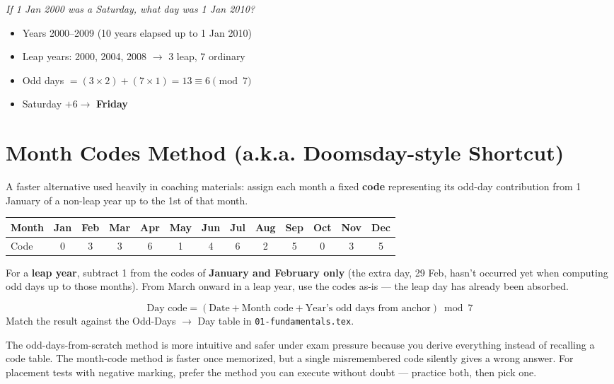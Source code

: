 \documentclass[11pt]{article}
\begin{document}
\begin{examplebox}
\emph{If 1 Jan 2000 was a Saturday, what day was 1 Jan 2010?}
\begin{itemize}[leftmargin=1.4em]
  \item Years 2000--2009 (10 years elapsed up to 1 Jan 2010)
  \item Leap years: 2000, 2004, 2008 $\to$ 3 leap, 7 ordinary
  \item Odd days $= (3\times2)+(7\times1) = 13 \equiv 6 \pmod 7$
  \item Saturday $+6 \to$ \textbf{Friday}
\end{itemize}
\end{examplebox}

\section{Month Codes Method (a.k.a. Doomsday-style Shortcut)}

A faster alternative used heavily in coaching materials: assign each month a fixed \textbf{code}
representing its odd-day contribution from 1 January of a non-leap year up to the 1st of that month.

\begin{formulabox}
\centering
\begin{tabular}{lcccccccccccc}
\toprule
Month & Jan & Feb & Mar & Apr & May & Jun & Jul & Aug & Sep & Oct & Nov & Dec \\
\midrule
Code & 0 & 3 & 3 & 6 & 1 & 4 & 6 & 2 & 5 & 0 & 3 & 5 \\
\bottomrule
\end{tabular}
\end{formulabox}

\begin{tipbox}
For a \textbf{leap year}, subtract 1 from the codes of \textbf{January and February only} (the extra
day, 29 Feb, hasn't occurred yet when computing odd days up to those months). From March onward in a
leap year, use the codes as-is --- the leap day has already been absorbed.
\end{tipbox}

\[
\text{Day code} = (\text{Date} + \text{Month code} + \text{Year's odd days from anchor}) \bmod 7
\]
Match the result against the Odd-Days $\to$ Day table in \texttt{01-fundamentals.tex}.

\begin{warnbox}
The odd-days-from-scratch method is more intuitive and safer under exam pressure because you derive
everything instead of recalling a code table. The month-code method is faster once memorized, but a
single misremembered code silently gives a wrong answer. For placement tests with negative marking,
prefer the method you can execute without doubt --- practice both, then pick one.
\end{warnbox}
\end{document}
